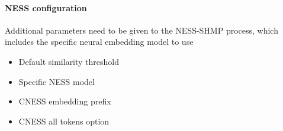 \documentclass[11pt]{scrreprt}
\begin{document}
\paragraph{NESS configuration}
\label{sec:ness-config}
Additional parameters need to be given to the NESS-SHMP process, which includes the specific neural embedding model to use 
 
\begin{itemize}
	\item Default similarity threshold
	\item Specific NESS model
	\item CNESS embedding prefix
	\item CNESS all tokens option
\end{itemize}






%
%
%
%
%
%
%
\end{document}
